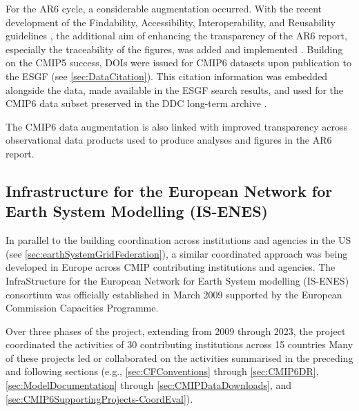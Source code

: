 \documentclass[manuscript]{copernicus}
\newcommand{\mycomment}[1]{}
\begin{document}
For the AR6 cycle, a considerable augmentation occurred. With the recent development of the Findability, Accessibility, Interoperability, and Reusability guidelines \citep[FAIR;][]{wilkinson_fair_2016}, the additional aim of enhancing the transparency of the AR6 report, especially the traceability of the figures, was added and implemented \citep{stockhause_data_2019}. Building on the CMIP5 success, DOIs were issued for CMIP6 datasets upon publication to the ESGF (see \autoref{sec:DataCitation}). This citation information was embedded alongside the data, made available in the ESGF search results, and used for the CMIP6 data subset preserved in the DDC long-term archive \citep{stockhause_cmip6_2017}.

The CMIP6 data augmentation is also linked with improved transparency across observational data products used to produce analyses and figures in the AR6 report.

\mycomment{
Notes in https://gmd.copernicus.org/articles/15/6047/2022/, https://datascience.codata.org/articles/10.5334/dsj-2019-020, https://docs.google.com/document/d/1aQbZj6xQYr-5_Ub9tw9hucm6WzcPIImYMShONPYrpyo/edit?tab=t.0; Stockhause et al 2024, PLOS Climate might need to be added
https://web.archive.org/web/20051118060835/https://sedac.ciesin.columbia.edu/ddc/
https://sedac.ciesin.columbia.edu/ddc/
}


\subsection{Infrastructure for the European Network for Earth System Modelling (IS-ENES)}
\label{sec:IS-ENES}

In parallel to the building coordination across institutions and agencies in the US (see \autoref{sec:earthSystemGridFederation}), a similar coordinated approach was being developed in Europe across CMIP contributing institutions and agencies. The InfraStructure for the European Network for Earth System modelling (IS-ENES) consortium was officially established in March 2009 supported by the European Commission Capacities Programme.

Over three phases of the project, extending from 2009 through 2023, the project coordinated the activities of 30 contributing institutions across 15 countries Many of these projects led or collaborated on the activities summarised in the preceding and following sections (e.g., \autoref{sec:CFConventions} through \autoref{sec:CMIP6DR}, \autoref{sec:ModelDocumentation} through \autoref{sec:CMIPDataDownloads}, and \autoref{sec:CMIP6SupportingProjects-CoordEval}).
\end{document}
